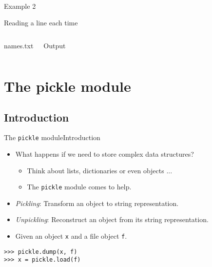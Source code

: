 \documentclass[10pt,compress]{beamer} %
\begin{document}
\begin{frame}[fragile]{Example 2}{}
	\begin{block}{Reading a line each time}
	\vspace{-0.2cm}
	
	\vspace{-0.2cm}
	\end{block}
	\begin{columns}
	\begin{block}{names.txt}
	
	\end{block}
	\begin{block}{Output}
	
	\end{block}
	\end{columns}
	
\end{frame}

\section{The pickle module}

\subsection{Introduction}
\begin{frame}[fragile]{The \texttt{pickle} module}{Introduction}
	\begin{itemize}
		\item What happens if we need to store complex data structures?
		\begin{itemize}
			\item Think about lists, dictionaries or even objects ...
			\item The \texttt{pickle} module comes to help.
		\end{itemize}
		\item \textit{Pickling}: Transform an object to string representation.
		\item \textit{Unpickling}: Reconstruct an object from its string representation.
		\item Given an object \texttt{x} and a file object \texttt{f}.
	\end{itemize}
\begin{verbatim}
>>> pickle.dump(x, f)
>>> x = pickle.load(f)
\end{verbatim}
\end{frame}
\end{document}
